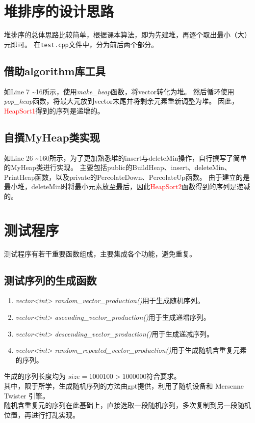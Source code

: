 \documentclass[UTF8]{ctexart}
\begin{document}
\pagestyle{fancy}
\fancyhead{}

\section{堆排序的设计思路}

堆排序的总体思路比较简单，根据课本算法，即为先建堆，再逐个取出最小（大）元即可。
在\texttt{test.cpp}文件中，分为前后两个部分。
\subsection{借助algorithm库工具}
如Line 7 \textasciitilde 16所示，使用\textit{make\_heap}函数，将vector转化为堆。
然后循环使用\textit{pop\_heap}函数，将最大元放到vector末尾并将剩余元素重新调整为堆。
因此，\textcolor{red}{HeapSort1}得到的序列是递增的。

\subsection{自撰MyHeap类实现}
如Line 26 \textasciitilde 160所示，为了更加熟悉堆的insert与deleteMin操作，自行撰写了简单的MyHeap类进行实现。
主要包括public的BuildHeap、insert、deleteMin、PrintHeap函数，以及private的PercolateDown、PercolateUp函数。
由于建立的是最小堆，deleteMin时将最小元素放至最后，因此\textcolor{red}{HeapSort2}函数得到的序列是递减的。

\section{测试程序}
测试程序有若干重要函数组成，主要集成各个功能，避免重复。
\subsection{测试序列的生成函数}
\begin{enumerate}
    \item \textit{vector<int> random\_vector\_production()}用于生成随机序列。
    \item \textit{vector<int> ascending\_vector\_production()}用于生成递增序列。
    \item \textit{vector<int> descending\_vector\_production()}用于生成递减序列。
    \item \textit{vector<int> random\_repeated\_vector\_production()}用于生成随机含重复元素的序列。
\end{enumerate}
生成的序列长度均为 $size = 1000100 > 1000000$符合要求。\\
其中，限于所学，生成随机序列的方法由gpt提供，利用了随机设备和 Mersenne Twister 引擎。\\
随机含重复元的序列在此基础上，直接选取一段随机序列，多次复制到另一段随机位置，再进行打乱实现。
\end{document}

